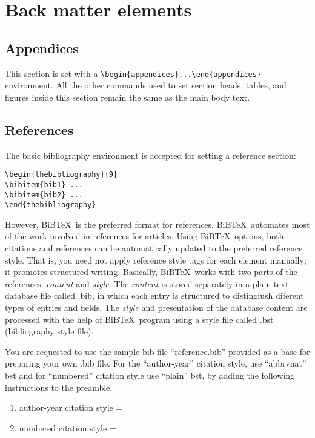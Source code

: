 \documentclass{article}
\begin{document}
\section{Back matter elements }
\subsection{Appendices}
This section is set with a \verb+\begin{appendices}...\end{appendices}+ environment. All the other commands used to set section heads, tables, and figures inside this section remain the same as the main body text.


\subsection{References}
The basic bibliography environment is accepted for setting a reference section:

\begin{verbatim}
\begin{thebibliography}{9}
\bibitem{bib1} ...
\bibitem{bib2} ...
\end{thebibliography}
\end{verbatim}
However, BiB\TeX\ is the preferred format for references. BiB\TeX\ automates most of the work involved in references for articles. Using BiB\TeX\ options, both citations and references can be automatically updated to the preferred reference style. That is, you need not apply reference style tags for each element manually; it promotes structured writing. Basically, BiB\TeX\ works with two parts of the references: \textit{content} and \textit{style}. The \textit{content} is stored separately in a plain text database file called .bib, in which each entry is structured to distingiush diferent types of entries and fields. The \textit{style} and presentation of the database content are processed with the help of BiB\TeX\ program using a style file called .bst (bibliography style file).

You are requested to use the sample bib file ``reference.bib'' provided as a base for preparing your own .bib file. For the ``author-year'' citation style, use ``abbrvnat'' bst and for ``numbered'' citation style use ``plain'' bst, by adding the following instructions to the preamble.

\begin{enumerate}
\item author-year citation style = \verb++
\item numbered citation style = \verb++
\end{enumerate}
\end{document}
